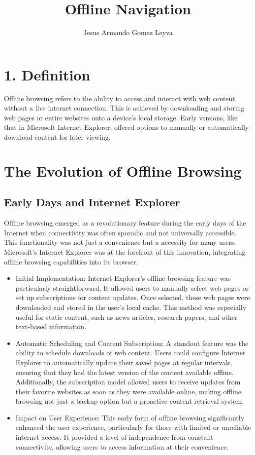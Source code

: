 \documentclass[12pt]{article}
\title{Offline Navigation}
\author{Jesus Armando Gomez Leyva}
\begin{document}
\maketitle

\section*{1. Definition}
Offline browsing refers to the ability to access and interact with web content without a live internet connection. This is achieved by downloading and storing web pages or entire websites onto a device’s local storage. Early versions, like that in Microsoft Internet Explorer, offered options to manually or automatically download content for later viewing.

\citep*{Network}
\section{The Evolution of Offline Browsing}

\subsection{Early Days and Internet Explorer}

Offline browsing emerged as a revolutionary feature during the early days of the Internet when connectivity was often sporadic and not universally accessible. This functionality was not just a convenience but a necessity for many users. Microsoft’s Internet Explorer was at the forefront of this innovation, integrating offline browsing capabilities into its browser.

\begin{itemize}[]
    \item Initial Implementation: Internet Explorer’s offline browsing feature was particularly straightforward. It allowed users to manually select web pages or set up subscriptions for content updates. Once selected, these web pages were downloaded and stored in the user’s local cache. This method was especially useful for static content, such as news articles, research papers, and other text-based information.
    \item Automatic Scheduling and Content Subscription: A standout feature was the ability to schedule downloads of web content. Users could configure Internet Explorer to automatically update their saved pages at regular intervals, ensuring that they had the latest version of the content available offline. Additionally, the subscription model allowed users to receive updates from their favorite websites as soon as they were available online, making offline browsing not just a backup option but a proactive content retrieval system.
    \item Impact on User Experience: This early form of offline browsing significantly enhanced the user experience, particularly for those with limited or unreliable internet access. It provided a level of independence from constant connectivity, allowing users to access information at their convenience.
\end{itemize}
\citep*{Network}
\end{document}
